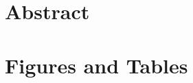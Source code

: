 \documentclass[letterpaper,12pt]{article}
\begin{document}


\begingroup
\let\newpage\relax%
\maketitle
\endgroup

\section*{Abstract}



%

\thispagestyle{empty}
\clearpage


\tableofcontents

\pagebreak

\begin{spacing}{1.2}
\begin{linenumbers}

\end{linenumbers}
\end{spacing}



{\small

}

\pagebreak

\setcounter{secnumdepth}{-1}

\section{Figures and Tables}


\end{document}
